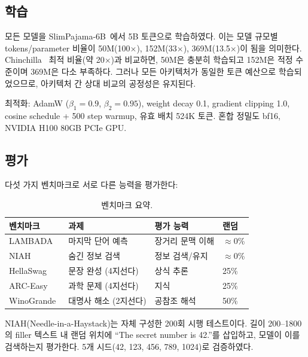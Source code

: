 \documentclass[11pt]{article}
\begin{document}
\subsection{학습}

모든 모델을 SlimPajama-6B~\citep{slimpajama}에서 5B 토큰으로 학습하였다. 이는 모델 규모별 tokens/parameter 비율이 50M(100$\times$), 152M(33$\times$), 369M(13.5$\times$)이 됨을 의미한다. Chinchilla~\citep{chinchilla} 최적 비율(약 20$\times$)과 비교하면, 50M은 충분히 학습되고 152M은 적정 수준이며 369M은 다소 부족하다. 그러나 모든 아키텍처가 동일한 토큰 예산으로 학습되었으므로, 아키텍처 간 상대 비교의 공정성은 유지된다.

최적화: AdamW ($\beta_1{=}0.9$, $\beta_2{=}0.95$), weight decay 0.1, gradient clipping 1.0, cosine schedule + 500 step warmup, 유효 배치 524K 토큰. 혼합 정밀도 bf16, NVIDIA H100 80GB PCIe GPU.

\subsection{평가}

다섯 가지 벤치마크로 서로 다른 능력을 평가한다:

\begin{table}[h]
\centering\small
\caption{벤치마크 요약.}
\begin{tabular}{llll}
\toprule
\textbf{벤치마크} & \textbf{과제} & \textbf{평가 능력} & \textbf{랜덤} \\
\midrule
LAMBADA~\citep{lambada} & 마지막 단어 예측 & 장거리 문맥 이해 & $\approx$0\% \\
NIAH & 숨긴 정보 검색 & 정보 검색/유지 & $\approx$0\% \\
HellaSwag~\citep{hellaswag} & 문장 완성 (4지선다) & 상식 추론 & 25\% \\
ARC-Easy~\citep{arc} & 과학 문제 (4지선다) & 지식 & 25\% \\
WinoGrande~\citep{winogrande} & 대명사 해소 (2지선다) & 공참조 해석 & 50\% \\
\bottomrule
\end{tabular}
\end{table}

NIAH(Needle-in-a-Haystack)는 자체 구성한 200회 시행 테스트이다. 길이 200--1800의 filler 텍스트 내 랜덤 위치에 ``The secret number is 42.''를 삽입하고, 모델이 이를 검색하는지 평가한다. 5개 시드(42, 123, 456, 789, 1024)로 검증하였다.

\end{document}
